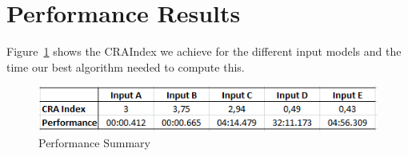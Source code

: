 \documentclass[submission,copyright,creativecommons]{eptcs}
\begin{document}
\section{Performance Results}
\label{sec:results}

Figure~\ref{fig:PerformanceSummary} shows the CRAIndex we achieve for the 
different input models and the time our best algorithm needed to compute this. 

\begin{figure}[H] \centering
	\includegraphics[width=0.8\linewidth]{images/performanceSummary.png}
 \caption{Performance Summary}
 \label{fig:PerformanceSummary}
\end{figure}




  
\end{document}

